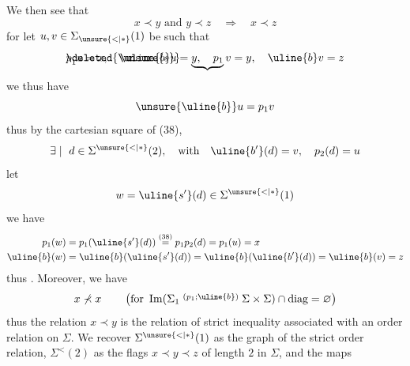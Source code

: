 We then see that
\[
x\prec y\text{ and }y\prec z\quad\Longrightarrow\quad x\prec z
\]
for let $u,v\in\Sigma_{\unsure{<|*}}(1)$ be such that
\[
\mathord{\rlap{$\deleted{\unsure{s}}$}p}_1 u=x,\quad\uline{b}u=\underbrace{y,\quad p_1}v=y,\quad\uline{b}v=z
\]
we thus have
\[
\unsure{\uline{b}}u=p_1v
\]
thus by the cartesian square of (38), 
\[
\exists\mid\ d\in\Sigma^{\unsure{<|*}}(2),\quad\text{with}\quad\uline{b'}(d)=v,\quad p_2(d)=u
\]
let
\[
w=\uline{s'}(d)\in\Sigma^{\unsure{<|*}}(1)
\]
we have
\[
\begin{aligned}
p_1(w)&=p_1(\uline{s'}(d))\overset{(38)}{=}p_1p_2(d)=p_1(u)=x\\
\uline{b}(w)&=\uline{b}(\uline{s'}(d))=\uline{b}(\uline{b'}(d))=\uline{b}(v)=z
\end{aligned}
\]
thus
.
Moreover, we have
\[
x\not\prec x\qquad\left(\text{for }\operatorname{Im}(\Sigma_1\overset{(p_1;\uline{b})}{\relbar\joinrel\relbar}\Sigma\times\Sigma)\cap\text{diag}=\varnothing\right)
\]
thus the relation $x\prec y$ is the relation
of strict inequality associated with an order
relation on $\Sigma$. We recover $\Sigma^{\unsure{<|*}}(1)$ as
the graph of the strict order relation,
$\Sigma^{<}(2)$ as the flags $x\prec y\prec z$ of
length $2$ in  $\Sigma$, and the maps

